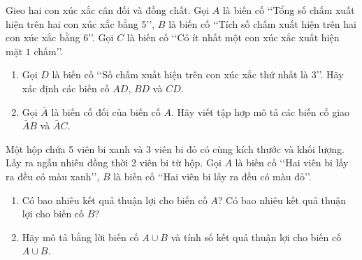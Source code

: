 \begin{bt}
	Gieo hai con xúc xắc cân đối và đồng chất. Gọi $A$ là biến cố \lq\lq Tổng số chấm xuất hiện trên hai con xúc xắc bằng 5\rq\rq, $B$ là biến cố \lq\lq Tích số chấm xuất hiện trên hai con xúc xắc bằng 6\rq\rq. Gọi $C$ là biến cố \lq\lq Có ít nhất một con xúc xắc xuất hiện mặt $1$ chấm\rq\rq.
	\begin{enumerate}
	\item Gọi $D$ là biến cố \lq\lq Số chấm xuất hiện trên con xúc xắc thứ nhất là 3\rq\rq. Hãy xác định các biến cố $AD$, $BD$ và $CD$.
	\item Gọi $\bar{A}$ là biến cố đối của biến cố $A$. Hãy viết tập hợp mô tả các biến cố giao $\bar{A}B$ và $\bar{A}C$.
	\end{enumerate}
\end{bt}
\begin{bt}%
	Một hộp chứa 5 viên bi xanh và 3 viên bi đỏ có cùng kích thước và khối lượng. Lấy ra ngẫu nhiên đồng thời 2 viên bi từ hộp. Gọi $A$ là biến cố \lq\lq Hai viên bi lấy ra đều có màu xanh\rq\rq, $B$ là biến cố \lq\lq Hai viên bi lấy ra đều có màu đỏ\rq\rq.
	\begin{enumerate}
	\item Có bao nhiêu kết quả thuận lợi cho biến cố $A$? Có bao nhiêu kết quả thuận lợi cho biến cố $B$?
	\item Hãy mô tả bằng lời biến cố $A \cup B$ và tính số kết quả thuận lợi cho biến cố $A \cup B$.
	\end{enumerate}
\end{bt}
